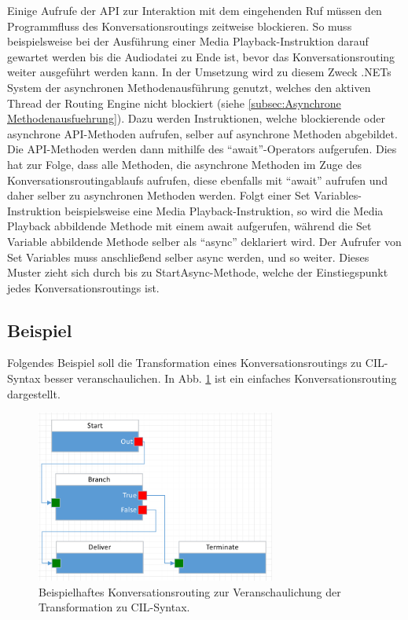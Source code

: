 Einige Aufrufe der API zur Interaktion mit dem eingehenden Ruf müssen den Programmfluss des Konversationsroutings zeitweise blockieren. So muss beispielsweise bei der Ausführung einer Media Playback-Instruktion darauf gewartet werden bis die Audiodatei zu Ende ist, bevor das Konversationsrouting weiter ausgeführt werden kann. In der Umsetzung wird zu diesem Zweck .NETs System der asynchronen Methodenausführung genutzt, welches den aktiven Thread der Routing Engine nicht blockiert (siehe \ref{subsec:Asynchrone Methodenausfuehrung}). Dazu werden Instruktionen, welche blockierende oder asynchrone API-Methoden aufrufen, selber auf asynchrone Methoden abgebildet. Die API-Methoden werden dann mithilfe des ``await''-Operators aufgerufen. Dies hat zur Folge, dass alle Methoden, die asynchrone Methoden im Zuge des Konversationsroutingablaufs aufrufen, diese ebenfalls mit ``await'' aufrufen und daher selber zu asynchronen Methoden werden. Folgt einer Set Variables-Instruktion beispielsweise eine Media Playback-Instruktion, so wird die Media Playback abbildende Methode mit einem await aufgerufen, während die Set Variable abbildende Methode selber als ``async'' deklariert wird. Der Aufrufer von Set Variables muss anschließend selber async werden, und so weiter. Dieses Muster zieht sich durch bis zu StartAsync-Methode, welche der Einstiegspunkt jedes Konversationsroutings ist.

\subsection{Beispiel}
\label{subsec:Beispiel}
Folgendes Beispiel soll die Transformation eines Konversationsroutings zu CIL-Syntax besser veranschaulichen. In Abb. \ref{fig:FlowToCode} ist ein einfaches Konversationsrouting dargestellt. 

\begin{figure} %
	\centering
		\includegraphics[width=0.7\textwidth]{img/FlowToCodeExample.png}
	\caption[Beispielhaftes Konversationsrouting zur Veranschaulichung der Transformation zu C\#-Syntax]{Beispielhaftes Konversationsrouting zur Veranschaulichung der Transformation zu CIL-Syntax.}
	\label{fig:FlowToCode}
\end{figure}

